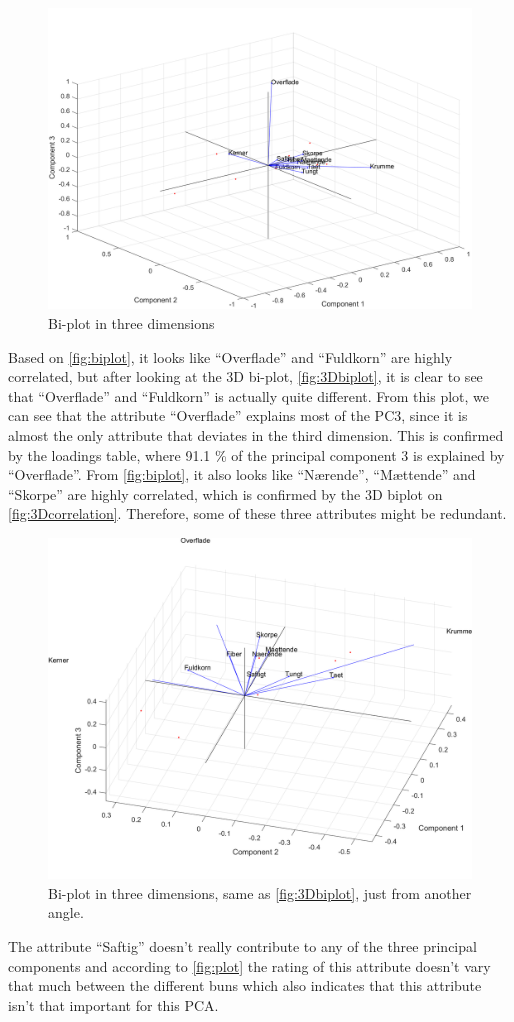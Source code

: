 %
%
\begin{figure}[H]
\centering
\includegraphics[width =\textwidth]{Figure/biplot_3D_std}
\caption{Bi-plot in three dimensions}
\label{fig:3Dbiplot}
\end{figure}
\noindent
%
Based on \autoref{fig:biplot}, it looks like ``Overflade'' and ``Fuldkorn'' are highly correlated, but after looking at the 3D bi-plot, \autoref{fig:3Dbiplot}, it is clear to see that ``Overflade'' and ``Fuldkorn'' is actually quite different. From this plot, we can see that the attribute ``Overflade'' explains most of the PC3, since it is almost the only attribute that deviates in the third dimension. This is confirmed by the loadings table, where 91.1 \% of the principal component 3 is explained by ``Overflade''.\blankline
%
From \autoref{fig:biplot}, it also looks like ``Nærende'', ``Mættende'' and ``Skorpe'' are highly correlated, which is confirmed by the 3D biplot on \autoref{fig:3Dcorrelation}. Therefore, some of these three attributes might be redundant. 
%
\begin{figure}[H]
\centering
\includegraphics[width =\textwidth]{Figure/biplot_3D_maet}
\caption{Bi-plot in three dimensions, same as \autoref{fig:3Dbiplot}, just from another angle.}
\label{fig:3Dcorrelation}
\end{figure}
\noindent
%
The attribute ``Saftig'' doesn't really contribute to any of the three principal components and according to \autoref{fig:plot} the rating of this attribute doesn't vary that much between the different buns which also indicates that this attribute isn't that important for this PCA.